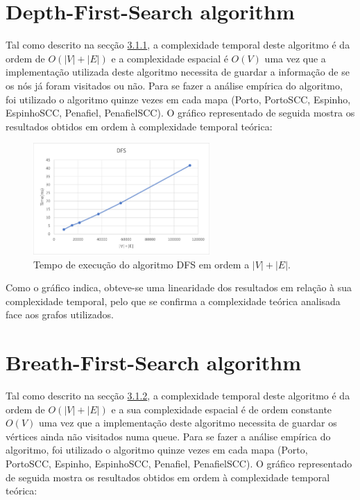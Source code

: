 \documentclass[12pt,a4paper]{report}
\begin{document}
\section{Depth-First-Search algorithm}
Tal como descrito na secção \hyperref[algo:dfs]{3.1.1}, a complexidade temporal deste algoritmo é da ordem de \( O(|V| + |E|) \) e a complexidade espacial 
é \(O(V)\) uma vez que a implementação utilizada deste algoritmo necessita de guardar a informação de se os nós já foram visitados ou não.
Para se fazer a análise empírica do algoritmo, foi utilizado o algoritmo quinze vezes em cada mapa (Porto, PortoSCC, Espinho, EspinhoSCC, Penafiel, PenafielSCC).
O gráfico representado de seguida mostra os resultados obtidos em ordem à complexidade temporal teórica:

\begin{figure}[H]
	\includegraphics[width=0.6\textwidth]{./imgs/charts/DFSTimeComplexity.png}
	\centering
	\caption{Tempo de execução do algoritmo DFS em ordem a $|V|+|E|$.}
\end{figure}


Como o gráfico indica, obteve-se uma linearidade dos resultados em relação à sua complexidade temporal, pelo que se confirma a complexidade teórica
analisada face aos grafos utilizados.


\section{Breath-First-Search algorithm}
Tal como descrito na secção \hyperref[algo:bfs]{3.1.2}, a complexidade temporal deste algoritmo é da ordem de \( O(|V| + |E|) \) e a sua complexidade espacial
é de ordem constante \(O(V)\) uma vez que a implementação deste algoritmo necessita de guardar os vértices ainda não visitados numa queue.
Para se fazer a análise empírica do algoritmo, foi utilizado o algoritmo quinze vezes em cada mapa (Porto, PortoSCC, Espinho, EspinhoSCC, Penafiel, PenafielSCC).
O gráfico representado de seguida mostra os resultados obtidos em ordem à complexidade temporal teórica:
\end{document}
